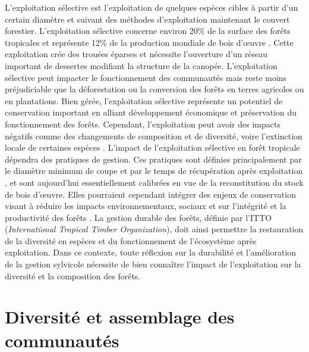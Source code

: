\documentclass[
  11pt,
  french,
  A4paper,
  extrafontsizes,onecolumn,openright
  ]{memoir}
\begin{document}
L'exploitation sélective est l'exploitation de quelques espèces cibles à
partir d'un certain diamètre et suivant des méthodes d'exploitation
maintenant le couvert forestier. L'exploitation sélective concerne
environ 20\% de la surface des forêts tropicales et représente 12\% de
la production mondiale de bois d'œuvre \autocite{Martin2015}. Cette
exploitation crée des trouées éparses et nécessite l'ouverture d'un
réseau important de dessertes modifiant la structure de la canopée.
L'exploitation sélective peut impacter le fonctionnement des communautés
mais reste moins préjudiciable que la déforestation ou la conversion des
forêts en terres agricoles ou en plantations. Bien gérée, l'exploitation
sélective représente un potentiel de conservation important en alliant
développement économique et préservation du fonctionnement des forêts.
Cependant, l'exploitation peut avoir des impacts négatifs comme des
changements de composition et de diversité, voire l'extinction locale de
certaines espèces \autocite{Gibson2011}. L'impact de l'exploitation
sélective en forêt tropicale dépendra des pratiques de gestion. Ces
pratiques sont définies principalement par le diamètre minimum de coupe
et par le temps de récupération après exploitation \autocite{Sist2015},
et sont aujourd'hui essentiellement calibrées en vue de la
reconstitution du stock de bois d'œuvre. Elles pourraient cependant
intégrer des enjeux de conservation visant à réduire les impacts
environnementaux, sociaux et sur l'intégrité et la productivité des
forêts \autocite{ITTO2005}. La gestion durable des forêts, définie par
l'ITTO (\emph{International Tropical Timber Organization}), doit ainsi
permettre la restauration de la diversité en espèces et du
fonctionnement de l'écosystème après exploitation. Dans ce contexte,
toute réflexion sur la durabilité et l'amélioration de la gestion
sylvicole nécessite de bien connaître l'impact de l'exploitation sur la
diversité et la composition des forêts.

\section{Diversité et assemblage des
communautés}\label{diversite-et-assemblage-des-communautes}
\end{document}
